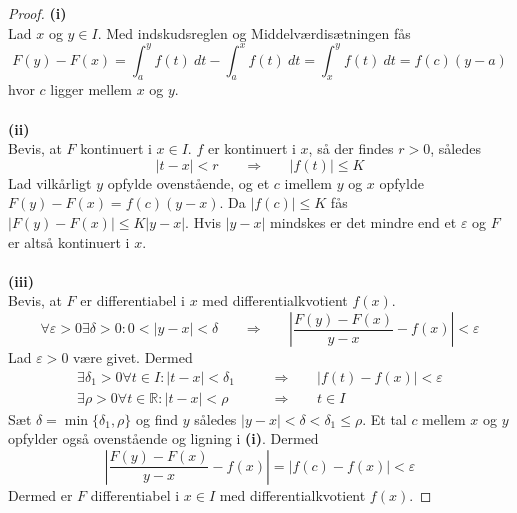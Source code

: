 \begin{proof}
\textbf{(i)}\\
Lad $x$ og $y\in I$. Med indskudsreglen og Middelværdisætningen fås
\begin{equation}
F(y)-F(x)=\int_a^y \! f(t) \ dt-\int_a^x \! f(t) \ dt=\int_x^y \! f(t) \ dt=f(c)(y-a)
\end{equation}
hvor $c$ ligger mellem $x$ og $y$.\\\\
\textbf{(ii)}\\
Bevis, at $F$ kontinuert i $x\in I$. $f$ er kontinuert i $x$, så der findes $r>0$, således
\begin{equation}
|t-x|<r\phantom{mm}\Rightarrow\phantom{mm}|f(t)|\leq K
\end{equation}
Lad vilkårligt $y$ opfylde ovenstående, og et $c$ imellem $y$ og $x$ opfylde $F(y)-F(x)=f(c)(y-x)$. Da $|f(c)|\leq K$ fås $|F(y)-F(x)|\leq K|y-x|$. Hvis $|y-x|$ mindskes er det mindre end et $\varepsilon$ og $F$ er altså kontinuert i $x$.\\\\
\textbf{(iii)}\\
Bevis, at $F$ er differentiabel i $x$ med differentialkvotient $f(x)$.
\begin{equation}
\forall \varepsilon >0\exists\delta >0:0<|y-x|<\delta\phantom{mm}\Rightarrow\phantom{mm}\left|\frac{F(y)-F(x)}{y-x}-f(x)\right|<\varepsilon
\end{equation}
Lad $\varepsilon >0$ være givet. Dermed
\begin{align}
\exists \delta_1 >0\forall t\in I:|t-x|<\delta_1\phantom{mm}&\Rightarrow\phantom{mm}|f(t)-f(x)|<\varepsilon\\
\exists \rho >0\forall t\in\mathbb{R}:|t-x|<\rho\phantom{mm}&\Rightarrow\phantom{mm}t\in I
\end{align}
Sæt $\delta=\min\{\delta_1,\rho\}$ og find $y$ således $|y-x|<\delta<\delta_1\leq\rho$. Et tal $c$ mellem $x$ og $y$ opfylder også ovenstående og ligning i \textbf{(i)}. Dermed
\begin{equation}
\left|\frac{F(y)-F(x)}{y-x}-f(x)\right|=|f(c)-f(x)|<\varepsilon
\end{equation}
Dermed er $F$ differentiabel i $x\in I$ med differentialkvotient $f(x)$.
\end{proof}
\pagestyle{empty} %
\pagestyle{fancy} %
